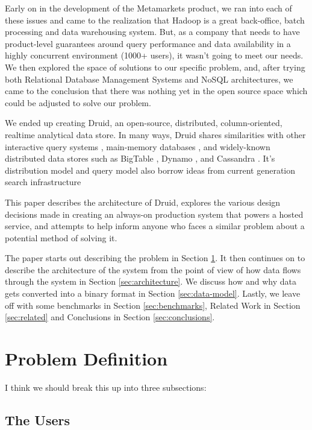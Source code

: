 \documentclass{vldb}
\begin{document}
Early on in the development of the Metamarkets product, we ran into each of these issues and came to the realization that Hadoop is a great back-office, batch processing and data warehousing system.  But, as a company that needs to have product-level guarantees around query performance and data availability in a highly concurrent environment (1000+ users), it wasn't going to meet our needs.  We then explored the space of solutions to our specific problem, and, after trying both Relational Database Management Systems and NoSQL architectures, we came to the conclusion that there was nothing yet in the open source space which could be adjusted to solve our problem.

We ended up creating Druid, an open-source, distributed, column-oriented, realtime analytical data store.  In many ways, Druid shares similarities with other interactive query systems \cite{melnik2010dremel}, main-memory databases \cite{farber2012sap}, and widely-known distributed data stores such as BigTable \cite{chang2008bigtable}, Dynamo \cite{decandia2007dynamo}, and Cassandra \cite{lakshman2010cassandra}.  It's distribution model and query model also borrow ideas from current generation search infrastructure \cite{paper-on-solr/lucene?, paper-on-sensei-db?, paper-on-elastic-search?}

This paper describes the architecture of Druid, explores the various design decisions made in creating an always-on production system that powers a hosted service, and attempts to help inform anyone who faces a similar problem about a potential method of solving it.

The paper starts out describing the problem in Section \ref{sec:problem-definition}.  It then continues on to describe the architecture of the system from the point of view of how data flows through the system in Section \ref{sec:architecture}.  We discuss how and why data gets converted into a binary format in Section \ref{sec:data-model}.  Lastly, we leave off with some benchmarks in Section \ref{sec:benchmarks}, Related Work in Section \ref{sec:related} and Conclusions in Section \ref{sec:conclusions}.

\section{Problem Definition}
\label{sec:problem-definition}

I think we should break this up into three subsections:

\subsection{The Users}
\end{document}
